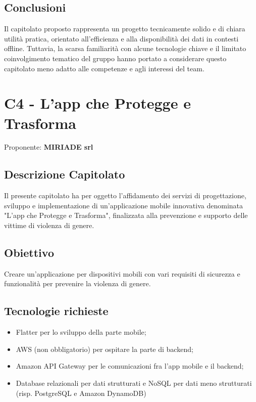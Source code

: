 \documentclass[a4paper,12pt]{article}
\begin{document}
{{    }

    \subsection*{Conclusioni}{
        Il capitolato proposto rappresenta un progetto tecnicamente solido e di chiara utilità pratica, orientato all'efficienza e alla disponibilità dei dati in contesti offline. Tuttavia, la scarsa familiarità con alcune tecnologie chiave e il limitato coinvolgimento tematico del gruppo hanno portato a considerare questo capitolato meno adatto alle competenze e agli interessi del team.
    }
}

\newpage

\section{C4 - L'app che Protegge e Trasforma}{
    Proponente: \textbf{ MIRIADE srl }
    \subsection*{Descrizione Capitolato}{
        Il presente capitolato ha per oggetto l'affidamento dei servizi di progettazione, sviluppo e implementazione di un'applicazione mobile innovativa denominata "L'app che Protegge e Trasforma", finalizzata alla prevenzione e supporto delle vittime di violenza di genere.
    }

    \subsection*{Obiettivo}{
        Creare un'applicazione per dispositivi mobili con vari requisiti di sicurezza e funzionalità per prevenire la violenza di genere.
    }

    \subsection*{Tecnologie richieste}{
        \begin{itemize}
            \item Flatter per lo sviluppo della parte mobile;
            \item AWS (non obbligatorio) per ospitare la parte di backend;
            \item Amazon API Gateway per le comunicazioni fra l'app mobile e il backend;
            \item Database relazionali per dati strutturati e NoSQL per dati meno strutturati (risp. PostgreSQL e Amazon DynamoDB)
        \end{itemize}
    }

}
\end{document}

